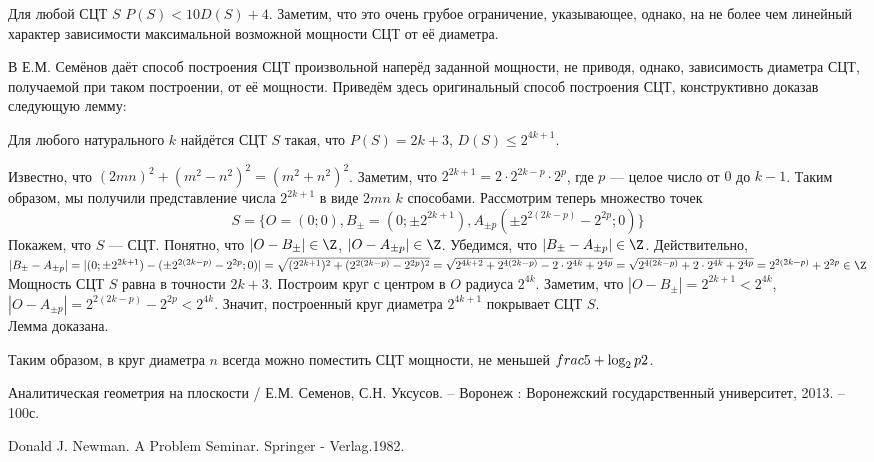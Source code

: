 \begin{sledstvie}
	Для любой СЦТ $S$ $P(S) < 10 D(S)+4$.
	Заметим, что это очень грубое ограничение, указывающее, однако,
	на не более чем линейный характер зависимости максимальной возможной мощности СЦТ от её диаметра.
\end{sledstvie}

В \cite{angem1kurs} Е.М. Семёнов даёт способ построения СЦТ произвольной наперёд заданной мощности, не приводя, однако, зависимость диаметра СЦТ, получаемой при таком построении, от её мощности.
Приведём здесь оригинальный способ построения СЦТ, конструктивно доказав следующую лемму:

\begin{lemma}
	Для любого натурального $k$ найдётся СЦТ $S$ такая, что $P(S)=2k+3$, $D(S)\leq 2^{4k+1}$.
\end{lemma}

\dokvo
	Известно, что $(2mn)^2+(m^2-n^2)^2=(m^2+n^2)^2$.
	Заметим, что $2^{2k+1} = 2 \cdot 2^{2k-p} \cdot 2^p$, где $p$ --- целое число от $0$ до $k-1$.
	Таким образом, мы получили представление числа $2^{2k+1}$ в виде $2mn$ $k$ способами.
	Рассмотрим теперь множество точек
	$$
		S=\{O=(0;0),B_\pm=(0;\pm 2^{2k+1}),A_{\pm p}(\pm 2^{2(2k-p)}-2^{2p};0)\}
	$$
	Покажем, что $S$ --- СЦТ.
	Понятно, что $|O-B_\pm|\in\Z$, $|O-A_{\pm p}|\in\Z$.
	Убедимся, что $|B_\pm-A_{\pm p}|\in\Z$.
	Действительно, $|B_\pm-A_{\pm p}|=|(0;\pm 2^{2k+1}) - (\pm 2^{2(2k-p)}-2^{2p};0)| = \sqrt{(2^{2k+1})^2+(2^{2(2k-p)}-2^{2p})^2}=
	\sqrt{2^{4k+2}+2^{4(2k-p)}-2\cdot 2^{4k}+2^{4p}}=\sqrt{2^{4(2k-p)}+2\cdot 2^{4k}+2^{4p}}=2^{2(2k-p)}+2^{2p}\in\Z$
	Мощность СЦТ $S$ равна в точности $2k+3$.
	Построим круг с центром в $O$ радиуса $2^{4k}$.
	Заметим, что $|O-B_\pm|=2^{2k+1}<2^{4k}$, $|O-A_{\pm p}| = 2^{2(2k-p)}-2^{2p} < 2^{4k}$.
	Значит, построенный круг диаметра $2^{4k+1}$ покрывает СЦТ $S$.
\\ Лемма доказана.

Таким образом, в круг диаметра $n$ всегда можно поместить СЦТ мощности, не меньшей $\\frac{5+\log_2{p}}{2}$.


\begin{thebibliography}{99}

 Аналитическая геометрия на плоскости / Е.М. Семенов, С.Н. Уксусов. – Воронеж : Воронежский государственный университет, 2013. – 100с.

 Donald J. Newman. A Problem Seminar. Springer - Verlag.1982.


\end{thebibliography}
